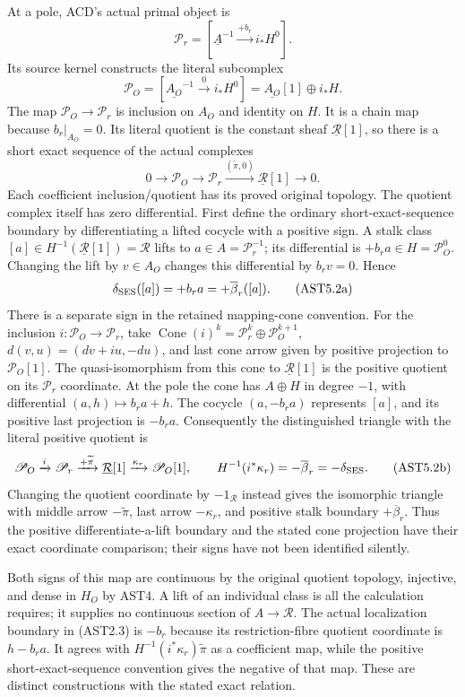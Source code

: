At a pole, ACD's actual primal object is \[
\mathscr P_r=[\underline A^{-1}\xrightarrow{+b_r}i_*H^0].
\] Its source kernel constructs the literal subcomplex \[
\mathscr P_O=[\underline{A_O}^{-1}\xrightarrow{0}i_*H^0]
=\underline{A_O}[1]\oplus i_*H.
\tag{AST5.1}
\] The map \(\mathscr P_O\to\mathscr P_r\) is inclusion on \(A_O\) and
identity on \(H\). It is a chain map because \(b_r|_{A_O}=0\). Its
literal quotient is the constant sheaf \(\underline{\mathcal R}[1]\), so
there is a short exact sequence of the actual complexes \[
0\to\mathscr P_O\longrightarrow\mathscr P_r
\xrightarrow{(\widetilde\pi,0)}\underline{\mathcal R}[1]\to0.
\tag{AST5.2}
\] Each coefficient inclusion/quotient has its proved original topology.
The quotient complex itself has zero differential. First define the
ordinary short-exact-sequence boundary by differentiating a lifted
cocycle with a positive sign. A stalk class
\([a]\in H^{-1}(\underline{\mathcal R}[1])=\mathcal R\) lifts to
\(a\in A=\mathscr P_r^{-1}\); its differential is
\(+b_ra\in H=\mathscr P_O^0\). Changing the lift by \(v\in A_O\) changes
this differential by \(b_rv=0\). Hence \[
\delta_{\rm SES}([a])=+b_ra=+\overline\beta_r([a]).
\tag{AST5.2a}
\] There is a separate sign in the retained mapping-cone convention. For
the inclusion \(i:\mathscr P_O\to\mathscr P_r\), take
\(\operatorname{Cone}(i)^k=\mathscr P_r^k\oplus\mathscr P_O^{k+1}\),
\(d(v,u)=(dv+i u,-du)\), and last cone arrow given by positive
projection to \(\mathscr P_O[1]\). The quasi-isomorphism from this cone
to \(\underline{\mathcal R}[1]\) is the positive quotient on its
\(\mathscr P_r\) coordinate. At the pole the cone has \(A\oplus H\) in
degree \(-1\), with differential \((a,h)\mapsto b_ra+h\). The cocycle
\((a,-b_ra)\) represents \([a]\), and its positive last projection is
\(-b_ra\). Consequently the distinguished triangle with the literal
positive quotient is \[
\mathscr P_O\xrightarrow{i}\mathscr P_r
\xrightarrow{+\widetilde\pi}\underline{\mathcal R}[1]
\xrightarrow{\kappa_r}\mathscr P_O[1],\qquad
H^{-1}(i^*\kappa_r)=-\overline\beta_r=-\delta_{\rm SES}.
\tag{AST5.2b}
\] Changing the quotient coordinate by \(-1_{\mathcal R}\) instead gives
the isomorphic triangle with middle arrow \(-\widetilde\pi\), last arrow
\(-\kappa_r\), and positive stalk boundary \(+\overline\beta_r\). Thus
the positive differentiate-a-lift boundary and the stated cone
projection have their exact coordinate comparison; their signs have not
been identified silently.

Both signs of this map are continuous by the original quotient topology,
injective, and dense in \(H_O\) by AST4. A lift of an individual class
is all the calculation requires; it supplies no continuous section of
\(A\to\mathcal R\). The actual localization boundary in (AST2.3) is
\(-b_r\) because its restriction-fibre quotient coordinate is
\(h-b_ra\). It agrees with \(H^{-1}(i^*\kappa_r)\widetilde\pi\) as a
coefficient map, while the positive short-exact-sequence convention
gives the negative of that map. These are distinct constructions with
the stated exact relation.

